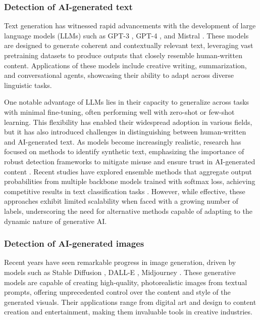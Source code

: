 \subsubsection{Detection of AI-generated text}
\label{sec:gen_text}
Text generation has witnessed rapid advancements with the development of large language models (LLMs) such as GPT-3 \cite{brown2020language}, GPT-4 \cite{achiam2023gpt}, and Mistral \cite{jiang2023mistral}. These models are designed to generate coherent and contextually relevant text, leveraging vast pretraining datasets to produce outputs that closely resemble human-written content. Applications of these models include creative writing, summarization, and conversational agents, showcasing their ability to adapt across diverse linguistic tasks. 

One notable advantage of LLMs lies in their capacity to generalize across tasks with minimal fine-tuning, often performing well with zero-shot or few-shot learning. This flexibility has enabled their widespread adoption in various fields, but it has also introduced challenges in distinguishing between human-written and AI-generated text. As models become increasingly realistic, research has focused on methods to identify synthetic text, emphasizing the importance of robust detection frameworks to mitigate misuse and ensure trust in AI-generated content \cite{wu2024continual}. Recent studies have explored ensemble methods that aggregate output probabilities from multiple backbone models trained with softmax loss, achieving competitive results in text classification tasks \cite{mohamed2024proposed, abburi2023generative}. However, while effective, these approaches exhibit limited scalability when faced with a growing number of labels, underscoring the need for alternative methods capable of adapting to the dynamic nature of generative AI.

\subsubsection{Detection of AI-generated images}
\label{sec:gen_image}
Recent years have seen remarkable progress in image generation, driven by models such as Stable Diffusion \cite{rombach2022high}, DALL-E \cite{ramesh2021zero}, Midjourney \cite{midjourney}.
These generative models are capable of creating high-quality, photorealistic images from textual prompts, offering unprecedented control over the content and style of the generated visuals. Their applications range from digital art and design to content creation and entertainment, making them invaluable tools in creative industries.

